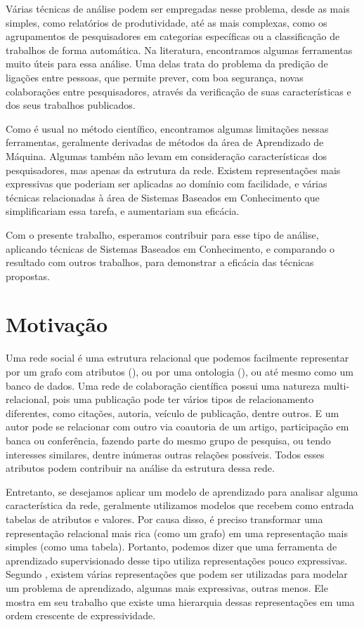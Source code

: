 Várias técnicas de análise podem ser empregadas nesse problema, desde as mais simples, como relatórios de produtividade, até as mais complexas, como os agrupamentos de pesquisadores em categorias específicas ou a classificação de trabalhos de forma automática. Na literatura, encontramos algumas ferramentas muito úteis para essa análise. Uma delas trata do problema da predição de ligações entre pessoas, que permite prever, com boa segurança, novas colaborações entre pesquisadores, através da verificação de suas características e dos seus trabalhos publicados.

Como é usual no método científico, encontramos algumas limitações nessas ferramentas, geralmente derivadas de métodos da área de Aprendizado de Máquina. Algumas também não levam em consideração características dos pesquisadores, mas apenas da estrutura da rede. Existem representações mais expressivas que poderiam ser aplicadas ao domínio com facilidade, e várias técnicas relacionadas à área de Sistemas Baseados em Conhecimento que simplificariam essa tarefa, e aumentariam sua eficácia.


Com o presente trabalho, esperamos contribuir para esse tipo de análise, aplicando técnicas de Sistemas Baseados em Conhecimento, e comparando o resultado com outros trabalhos, para demonstrar a eficácia das técnicas propostas.

\section{Motivação}
\label{sec:motivacao}

Uma rede social é uma estrutura relacional que podemos facilmente representar por um grafo com atributos (\citet{Cervantes2014}), ou por uma ontologia (\citet{Anaue2009}), ou até mesmo como um banco de dados. Uma rede de colaboração científica possui uma natureza multi-relacional, pois uma publicação pode ter vários tipos de relacionamento diferentes, como citações, autoria, veículo de publicação, dentre outros. E um autor pode se relacionar com outro via coautoria de um artigo, participação em banca ou conferência, fazendo parte do mesmo grupo de pesquisa, ou tendo interesses similares, dentre inúmeras outras relações possíveis. Todos esses atributos podem contribuir na análise da estrutura dessa rede.

Entretanto, se desejamos aplicar um modelo de aprendizado para analisar alguma característica da rede, geralmente utilizamos modelos que recebem como entrada tabelas de atributos e valores. Por causa disso, é preciso transformar uma representação relacional mais rica (como um grafo) em uma representação mais simples (como uma tabela). Portanto, podemos dizer que uma ferramenta de aprendizado supervisionado desse tipo utiliza representações pouco expressivas. Segundo \citet{Raedt2008}, existem várias representações que podem ser utilizadas para modelar um problema de aprendizado, algumas mais expressivas, outras menos. Ele mostra em seu trabalho que existe uma hierarquia dessas representações em uma ordem crescente de expressividade.

